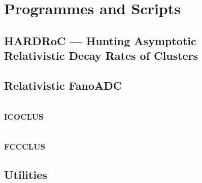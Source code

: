 \chapter{Programmes and Scripts}

\section{HARDRoC --- Hunting Asymptotic Relativistic Decay Rates of Clusters}
\section{Relativistic FanoADC}
\section{\textsc{icoclus}}
\section{\textsc{fccclus}}
\section{Utilities}
